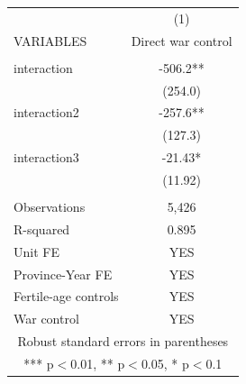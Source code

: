 \begin{tabular}{lc} \hline
 & (1) \\
VARIABLES & Direct war control \\ \hline
 &  \\
interaction & -506.2** \\
 & (254.0) \\
interaction2 & -257.6** \\
 & (127.3) \\
interaction3 & -21.43* \\
 & (11.92) \\
 &  \\
Observations & 5,426 \\
R-squared & 0.895 \\
Unit FE & YES \\
Province-Year FE & YES \\
Fertile-age controls & YES \\
 War control & YES \\ \hline
\multicolumn{2}{c}{ Robust standard errors in parentheses} \\
\multicolumn{2}{c}{ *** p$<$0.01, ** p$<$0.05, * p$<$0.1} \\
\end{tabular}
